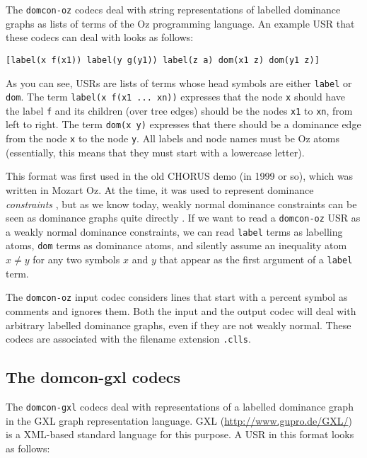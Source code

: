 The \verb?domcon-oz? codecs deal with string representations of
labelled dominance graphs as lists of terms of the Oz programming
language. An example USR that these codecs can deal with looks as
follows:

\begin{verbatim}
[label(x f(x1)) label(y g(y1)) label(z a) dom(x1 z) dom(y1 z)]
\end{verbatim}

As you can see, USRs are lists of terms whose head symbols are either
\verb?label? or \verb?dom?. The term \verb?label(x f(x1 ... xn))?
expresses that the node \verb?x? should have the label \verb?f? and
its children (over tree edges) should be the nodes \verb?x1? to
\verb?xn?, from left to right. The term \verb?dom(x y)? expresses that
there should be a dominance edge from the node \verb?x? to the node
\verb?y?. All labels and node names must be Oz atoms (essentially,
this means that they must start with a lowercase letter).

This format was first used in the old CHORUS demo (in 1999 or so),
which was written in Mozart Oz. At the time, it was used to represent
dominance \emph{constraints} \cite{clls2000}, but as we know today,
weakly normal dominance constraints can be seen as dominance graphs
quite directly \cite{Koller04}. If we want to read a \verb?domcon-oz?
USR as a weakly normal dominance constraints, we can read \verb?label?
terms as labelling atoms, \verb?dom? terms as dominance atoms, and
silently assume an inequality atom $x \neq y$ for any two symbols $x$
and $y$ that appear as the first argument of a \verb?label? term.

The \verb?domcon-oz? input codec considers lines that start with a
percent symbol as comments and ignores them. Both the input and the
output codec will deal with arbitrary labelled dominance graphs, even
if they are not weakly normal. These codecs are associated with the
filename extension \verb?.clls?.



\subsection{The domcon-gxl codecs}

The \verb?domcon-gxl? codecs deal with representations of a labelled
dominance graph in the GXL graph representation language. GXL
(\url{http://www.gupro.de/GXL/}) is a XML-based standard language for
this purpose. A USR in this format looks as follows:

